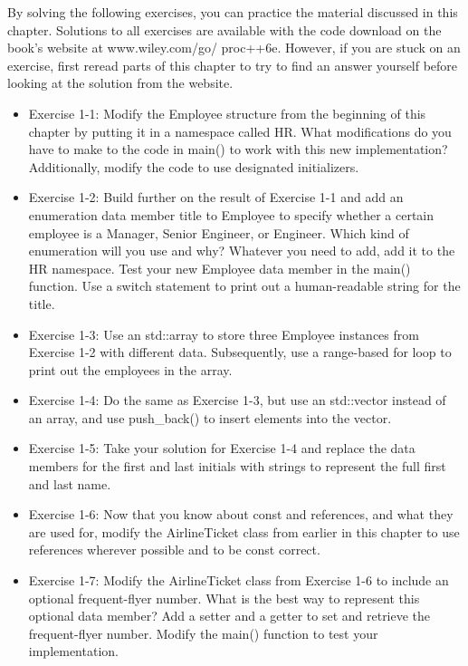 By solving the following exercises, you can practice the material discussed in this chapter. Solutions to all exercises are available with the code download on the book’s website at www.wiley.com/go/ proc++6e. However, if you are stuck on an exercise, first reread parts of this chapter to try to find an answer yourself before looking at the solution from the website.

\begin{itemize}
\item
Exercise 1-1: Modify the Employee structure from the beginning of this chapter by putting it in a namespace called HR. What modifications do you have to make to the code in main() to work with this new implementation? Additionally, modify the code to use designated initializers.

\item
Exercise 1-2: Build further on the result of Exercise 1-1 and add an enumeration data member title to Employee to specify whether a certain employee is a Manager, Senior Engineer, or Engineer. Which kind of enumeration will you use and why? Whatever you need to add, add it to the HR namespace. Test your new Employee data member in the main() function. Use a switch statement to print out a human-readable string for the title.

\item
Exercise 1-3: Use an std::array to store three Employee instances from Exercise 1-2 with different data. Subsequently, use a range-based for loop to print out the employees in the array.

\item
Exercise 1-4: Do the same as Exercise 1-3, but use an std::vector instead of an array, and use push\_back() to insert elements into the vector.

\item
Exercise 1-5: Take your solution for Exercise 1-4 and replace the data members for the first and last initials with strings to represent the full first and last name.

\item
Exercise 1-6: Now that you know about const and references, and what they are used for, modify the AirlineTicket class from earlier in this chapter to use references wherever possible and to be const correct.

\item
Exercise 1-7: Modify the AirlineTicket class from Exercise 1-6 to include an optional frequent-flyer number. What is the best way to represent this optional data member? Add a setter and a getter to set and retrieve the frequent-flyer number. Modify the main() function to test your implementation.
\end{itemize}